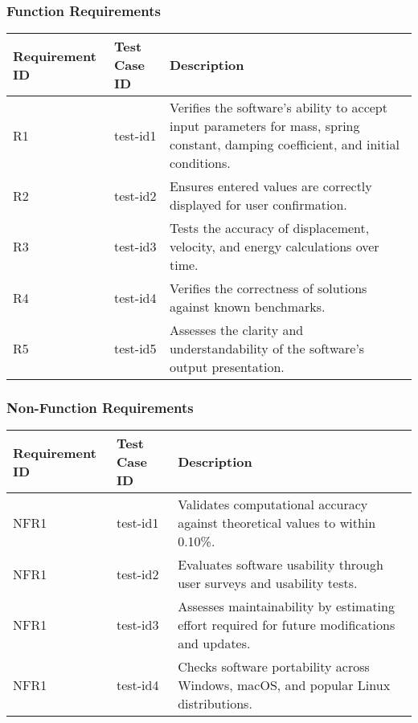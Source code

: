 \documentclass[12pt, titlepage]{article}
\begin{document}
\subsubsection{Function Requirements}

\begin{tabularx}{\textwidth}{p{3cm}p{2cm}X}
\toprule {\bf Requirement ID} & {\bf Test Case ID} &{\bf Description}\\
\midrule

R1 & test-id1 & Verifies the software's ability to accept input parameters for mass, 
spring constant, damping coefficient, and initial conditions.\\

R2 & test-id2 & Ensures entered values are correctly displayed for user confirmation.\\

R3 & test-id3 & Tests the accuracy of displacement, velocity, and energy calculations 
over time.\\

R4 & test-id4 & Verifies the correctness of solutions against known benchmarks.\\

R5 & test-id5 & Assesses the clarity and understandability of the software's output 
presentation.\\

\bottomrule
\end{tabularx}

\subsubsection{Non-Function Requirements}

\begin{tabularx}{\textwidth}{p{3cm}p{2cm}X}
\toprule {\bf Requirement ID} & {\bf Test Case ID} &{\bf Description}\\
\midrule

NFR1 & test-id1 & Validates computational accuracy against theoretical values to 
within 0.10\%.\\

NFR1 & test-id2 & Evaluates software usability through user surveys and usability 
tests.\\

NFR1 & test-id3 & Assesses maintainability by estimating effort required for future 
modifications and updates.\\

NFR1 & test-id4 & Checks software portability across Windows, macOS, and popular 
Linux distributions.\\

\bottomrule
\end{tabularx}
\end{document}
